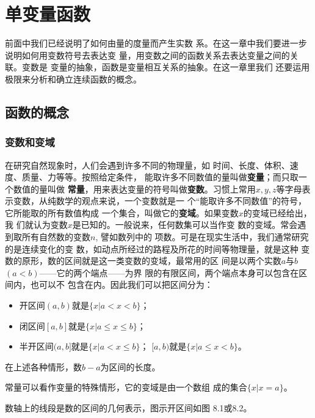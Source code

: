\chapter{单变量函数}
前面中我们已经说明了如何由量的度量而产生实数
系。在这一章中我们要进一步说明如何用变数符号去表达变
量，用变数之间的函数关系去表达变量之间的关联。变数是
变量的抽象，函数是变量相互关系的抽象。在这一章里我们
还要运用极限来分析和确立连续函数的概念。

\section{函数的概念}
\subsection{变数和变域}
在研究自然现象时，人们会遇到许多不同的物理量，如
时间、长度、体积、速度、质量、力等等。按照给定条件，
能取许多不同数值的量叫做\textbf{变量}；而只取一个数值的量叫做
\textbf{常量}，用来表达变量的符号叫做\textbf{变数}。习惯上常用$x,y,
z$等字母表示变数，从纯数学的观点来说，一个变数就是一
个“能取许多不同数值”的符号，它所能取的所有数值构成
一个集合，叫做它的\textbf{变域}。如果变数$x$的变域已经给出，我
们就认为变数$x$是已知的。一般说来，任何数集可以当作变
数的变域。常会遇到取所有自然数的变数$n$, 譬如数列中的
项数。可是在现实生活中，我们通常研究的是连续变化的变
数，如动点所经过的路程及所花的时间等物理量，就是这种
变数的原形，数的区间就是这一类变数的变域，最常用的区
间是以两个实数$a$与$b$ $(a<b)$——它的两个端点——为界
限的有限区间，两个端点本身可以包含在区间内，也可以不
包含在内。因此我们可以把区间分为：
\begin{itemize}
    \item 开区间$(a,b)$就是$\{x|a<x<b\}$；
    \item  闭区间$[a,b]$就是$\{x|a\le x\le b\}$；
    \item  半开区间$(a,b]$就是$\{x|a<x\le b\}$；
    $[a,b)$就是$\{x|a\le x<b\}$。
\end{itemize}
在上述各种情形，数$b-a$为区间的长度。

常量可以看作变量的特殊情形，它的变域是由一个数组
成的集合$\{x|x=a\}$。

数轴上的线段是数的区间的几何表示，图示开区间如图
8.1或8.2。

